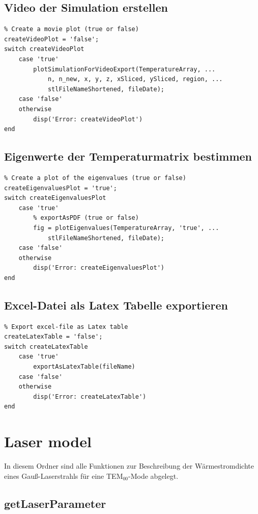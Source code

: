 \documentclass{scrartcl}
\begin{document}
\subsection{Video der Simulation erstellen}

\begin{lstlisting}
% Create a movie plot (true or false)
createVideoPlot = 'false';
switch createVideoPlot
    case 'true'
        plotSimulationForVideoExport(TemperatureArray, ...
            n, n_new, x, y, z, xSliced, ySliced, region, ...
            stlFileNameShortened, fileDate);
    case 'false'
    otherwise
        disp('Error: createVideoPlot')
end
\end{lstlisting}

\subsection{Eigenwerte der Temperaturmatrix bestimmen}

\begin{lstlisting}
% Create a plot of the eigenvalues (true or false)
createEigenvaluesPlot = 'true';
switch createEigenvaluesPlot
    case 'true'
        % exportAsPDF (true or false)
        fig = plotEigenvalues(TemperatureArray, 'true', ...
            stlFileNameShortened, fileDate);
    case 'false'
    otherwise
        disp('Error: createEigenvaluesPlot')
end
\end{lstlisting}

\subsection{Excel-Datei als Latex Tabelle exportieren}

\begin{lstlisting}
% Export excel-file as Latex table
createLatexTable = 'false';
switch createLatexTable
    case 'true'
        exportAsLatexTable(fileName)
    case 'false'
    otherwise
        disp('Error: createLatexTable')
end
\end{lstlisting}

\section{Laser model}\label{sec:laserModel}

In diesem Ordner sind alle Funktionen zur Beschreibung der Wärmestromdichte eines Gauß-Laserstrahls für eine TEM$_{00}$-Mode abgelegt.

\subsection{getLaserParameter}\label{subsec:getLaserParameter}
\end{document}
